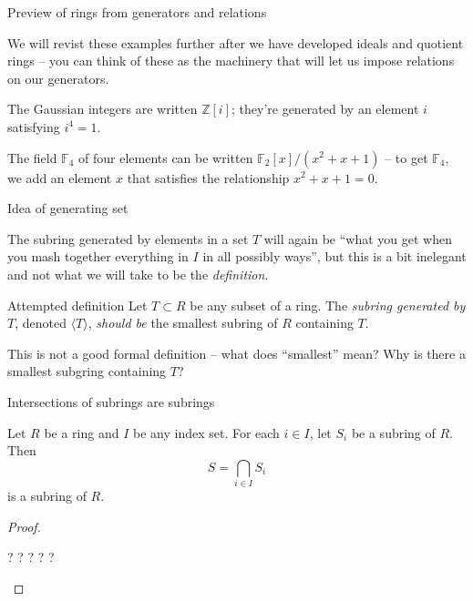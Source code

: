 \documentclass{beamer}
\begin{document}
\begin{frame}{Preview of rings from generators and relations}

We will revist these examples further after we have developed ideals and quotient rings -- you can think of these as the machinery that will let us impose relations on our generators.

\begin{example}
The Gaussian integers are written $\mathbb{Z}[i]$; they're generated by an element $i$ satisfying $i^4=1$.
\end{example}

\begin{example}
The field $\mathbb{F}_4$ of four elements can be written $\mathbb{F}_2[x]/(x^2+x+1)$ -- to get $\mathbb{F}_4$, we add an element $x$ that satisfies the relationship $x^2+x+1=0$.
\end{example}

\end{frame}


\begin{frame}{Idea of generating set}

The subring generated by elements in a set $T$ will again be ``what you get when you mash together everything in $I$ in all possibly ways'', but this is a bit inelegant and not what we will take to be the \emph{definition}.


\begin{block}{Attempted definition} Let $T\subset R$ be any subset of a ring.  The \emph{subring generated by $T$}, denoted $\langle T\rangle$, \emph{should be} the smallest subring of $R$ containing $T$.
\end{block}

This is not a good formal definition -- what does ``smallest'' mean?  Why is there a smallest subgring containing $T$? 


\end{frame}

\begin{frame}{Intersections of subrings are subrings}


\begin{lemma} Let $R$ be a ring and $I$ be any index set. For each $i\in I$, let $S_i$ be a subring of $R$.  Then
$$S=\bigcap_{i\in I} S_i$$
is a subring of $R$.

\end{lemma}
\begin{proof} 
\begin{center} ? ? ? ? ? \end{center}
\end{proof}

\end{frame}
\end{document}
